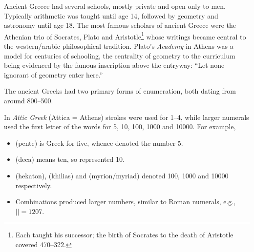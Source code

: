 Ancient Greece had several schools, mostly private and open only to men. %
Typically arithmetic was taught until age 14, followed by geometry  and astronomy until age 18. The most famous scholars of ancient Greece were the Athenian trio of Socrates, Plato and Aristotle\footnote{Each taught his successor; the birth of Socrates to the death of Aristotle covered 470--322\BC.} whose writings became central to the western/arabic philosophical tradition. Plato's \emph{Academy} in Athens was a model for centuries of schooling, the centrality of geometry to the curriculum being evidenced by the famous inscription above the entryway: ``Let none ignorant of geometry enter here.''



The ancient Greeks had two primary forms of enumeration, both dating from around 800--500\BC.\smallbreak

In \emph{Attic Greek} (Attica = Athens) strokes were used for 1--4, while larger numerals used the first letter of the words for 5, 10, 100, 1000 and 10000. For example,
\begin{itemize}\itemsep0pt
  \item {} (pente) is Greek for five, whence  denoted the number 5.
	\item {} (deca) means ten, so  represented 10.
	\item {} (hekaton),  (khilias) and  (myrion/myriad) denoted 100, 1000 and 10000 respectively.
	\item Combinations produced larger numbers, similar to Roman numerals, e.g., $||=1207$.
\end{itemize}

